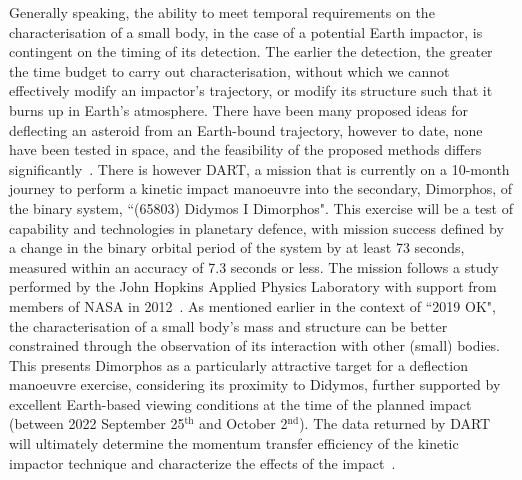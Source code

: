 Generally speaking, the ability to meet temporal requirements on the characterisation of a small body, in the case of a potential Earth impactor, is contingent on the timing of its detection. The earlier the detection, the greater the time budget to carry out characterisation, without which we cannot effectively modify an impactor's trajectory, or modify its structure such that it burns up in Earth's atmosphere. There have been many proposed ideas for deflecting an asteroid from an Earth-bound trajectory, however to date, none have been tested in space, and the feasibility of the proposed methods differs significantly~\cite{Harris2015}. There is however  \gls{DART}, a mission that is currently on a 10-month journey to perform a kinetic impact manoeuvre into the secondary, Dimorphos, of the binary system, ``(65803) Didymos I Dimorphos". This exercise will be a test of  capability and technologies in planetary defence, with mission success defined by a change in the binary orbital period of the system by at least 73 seconds, measured within an accuracy of 7.3 seconds or less. The mission follows a study performed by the John Hopkins Applied Physics Laboratory with support from members of \gls{NASA} in 2012~\cite{Cheng2012}. As mentioned earlier in the context of ``2019 OK", the characterisation of a small body's mass and structure can be better constrained through the observation of its interaction with other (small) bodies. This presents Dimorphos as a particularly attractive target for a deflection manoeuvre exercise, considering its proximity to Didymos, further supported by excellent Earth-based viewing conditions at the time of the planned impact (between 2022 September 25$^{\text{th}}$ and October 2$^{\text{nd}}$). The data returned by \gls{DART} will ultimately determine the momentum transfer efficiency of the kinetic impactor technique and characterize the effects of the impact~\cite{Cheng2012, Rivkin2021}.

